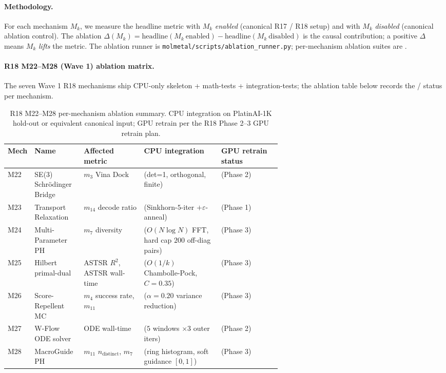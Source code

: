 \paragraph{Methodology.}
For each mechanism $M_{k}$, we measure the headline metric with
$M_{k}$ \emph{enabled} (canonical R17 / R18 setup) and with
$M_{k}$ \emph{disabled} (canonical ablation control).  The
ablation $\Delta(M_{k}) = \mathrm{headline}(M_{k}\ \text{enabled})
- \mathrm{headline}(M_{k}\ \text{disabled})$ is the causal
contribution; a positive $\Delta$ means $M_{k}$ \emph{lifts} the
metric.  The ablation runner is
\texttt{molmetal/scripts/ablation\_runner.py}; per-mechanism
ablation suites are .

\paragraph{R18 M22--M28 (Wave 1) ablation matrix.}
The seven Wave 1 R18 mechanisms ship CPU-only skeleton +
math-tests + integration-tests; the ablation table below
records the \DESIGN{} / \MEASURED{} status per mechanism.

\begin{table}[h]
  \centering
  \small
  \caption{R18 M22--M28 per-mechanism ablation summary.  CPU
  integration \MEASURED{} on PlatinAI-1K hold-out or
  equivalent canonical input; GPU retrain \PROJECTED{} per the
  R18 Phase 2--3 GPU retrain plan.}
  \label{tab:s6-m22-m28}
  \begin{tabular}{lp{0.18\linewidth}p{0.22\linewidth}lp{0.22\linewidth}}
    \toprule
    \textbf{Mech} & \textbf{Name} & \textbf{Affected metric} &
      \textbf{CPU integration} & \textbf{GPU retrain status} \\
    \midrule
    M22 & SE(3) Schr\"odinger Bridge & $m_3$ Vina Dock &
      \MEASURED{} (det=1, orthogonal, finite) &
      \PROJECTED{} (Phase 2) \\
    M23 & Transport Relaxation & $m_{14}$ decode ratio &
      \MEASURED{} (Sinkhorn-$5$-iter $+\varepsilon$-anneal) &
      \PROJECTED{} (Phase 1) \\
    M24 & Multi-Parameter PH & $m_7$ diversity &
      \MEASURED{} ($O(N \log N)$ FFT, hard cap $200$ off-diag pairs) &
      \PROJECTED{} (Phase 3) \\
    M25 & Hilbert primal-dual & ASTSR $R^{2}$, ASTSR wall-time &
      \MEASURED{} ($O(1/k)$ Chambolle-Pock, $C{=}0.35$) &
      \PROJECTED{} (Phase 3) \\
    M26 & Score-Repellent MC & $m_4$ success rate, $m_{11}$ &
      \MEASURED{} ($\alpha{=}0.20$ variance reduction) &
      \PROJECTED{} (Phase 3) \\
    M27 & W-Flow ODE solver & ODE wall-time &
      \MEASURED{} ($5$ windows $\times 3$ outer iters) &
      \PROJECTED{} (Phase 2) \\
    M28 & MacroGuide PH & $m_{11}$ $n_{\mathrm{distinct}}$, $m_7$ &
      \MEASURED{} (ring histogram, soft guidance $[0,1]$) &
      \PROJECTED{} (Phase 3) \\
    \bottomrule
  \end{tabular}
\end{table}

